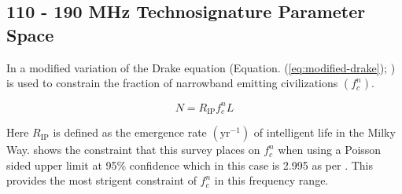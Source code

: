 \subsection{110 - 190 MHz Technosignature Parameter Space}

In \cite{2022VishalPulsed} a modified variation of the Drake equation (Equation. (\ref{eq:modified-drake}); \citealt{Sagan1966}) is used to constrain the fraction of narrowband emitting civilizations $(f_c^n)$.  

\begin{equation}
    N =  R_{\text{IP}}f^n_cL
    \label{eq:modified-drake}
\end{equation}

Here  $R_{\text{IP}}$ is defined as the emergence rate $(\text{yr}^{-1})$ of intelligent life in the Milky Way.   shows the constraint that this survey places on $f_c^n$ when using a Poisson sided upper limit at 95\% confidence which in this case is 2.995 as per \cite{Gehrels:1986p10835}. This provides the most strigent constraint of $f^n_c$ in this frequency range.

